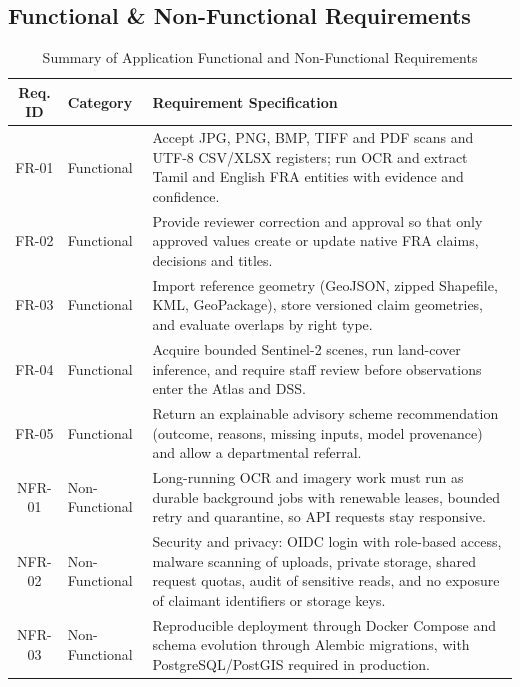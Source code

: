\documentclass[11pt, a4paper]{article}
\begin{document}
\subsection{Functional \& Non-Functional Requirements}
\begin{table}[H]
    \centering
    \footnotesize
    \renewcommand{\arraystretch}{1.25}
    \begin{tabular}{|c|p{3.0cm}|p{9.2cm}|}
        \hline
        \textbf{Req. ID} & \textbf{Category} & \textbf{Requirement Specification} \\
        \hline
        FR-01 & Functional & Accept JPG, PNG, BMP, TIFF and PDF scans and UTF-8 CSV/XLSX registers; run OCR and extract Tamil and English FRA entities with evidence and confidence. \\
        \hline
        FR-02 & Functional & Provide reviewer correction and approval so that only approved values create or update native FRA claims, decisions and titles. \\
        \hline
        FR-03 & Functional & Import reference geometry (GeoJSON, zipped Shapefile, KML, GeoPackage), store versioned claim geometries, and evaluate overlaps by right type. \\
        \hline
        FR-04 & Functional & Acquire bounded Sentinel-2 scenes, run land-cover inference, and require staff review before observations enter the Atlas and DSS. \\
        \hline
        FR-05 & Functional & Return an explainable advisory scheme recommendation (outcome, reasons, missing inputs, model provenance) and allow a departmental referral. \\
        \hline
        NFR-01 & Non-Functional & Long-running OCR and imagery work must run as durable background jobs with renewable leases, bounded retry and quarantine, so API requests stay responsive. \\
        \hline
        NFR-02 & Non-Functional & Security and privacy: OIDC login with role-based access, malware scanning of uploads, private storage, shared request quotas, audit of sensitive reads, and no exposure of claimant identifiers or storage keys. \\
        \hline
        NFR-03 & Non-Functional & Reproducible deployment through Docker Compose and schema evolution through Alembic migrations, with PostgreSQL/PostGIS required in production. \\
        \hline
    \end{tabular}
    \caption{Summary of Application Functional and Non-Functional Requirements}
\end{table}
\end{document}
